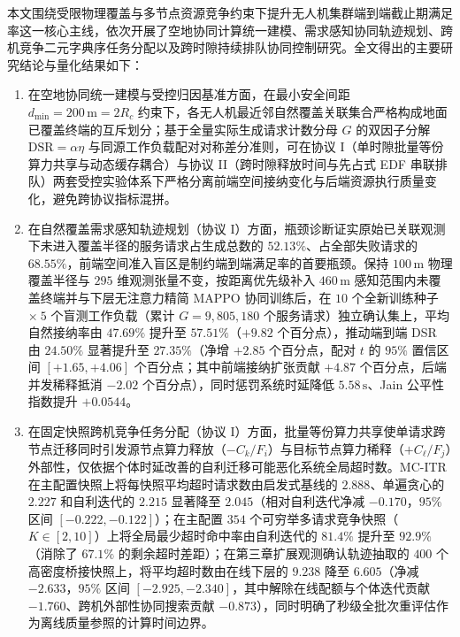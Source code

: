 \conclusionchapter
\label{cha:conclusion}

本文围绕受限物理覆盖与多节点资源竞争约束下提升无人机集群端到端截止期满足率这一核心主线，依次开展了空地协同计算统一建模、需求感知协同轨迹规划、跨机竞争二元字典序任务分配以及跨时隙持续排队协同控制研究。全文得出的主要研究结论与量化结果如下：

\begin{enumerate}
\item 在空地协同统一建模与受控归因基准方面，在最小安全间距 $d_{\min}=200\,\mathrm{m}=2R_c$ 约束下，各无人机最近邻自然覆盖关联集合严格构成地面已覆盖终端的互斥划分；基于全量实际生成请求计数分母 $G$ 的双因子分解 $\mathrm{DSR}=\alpha\eta$ 与同源工作负载配对对称差分准则，可在协议 I（单时隙批量等份算力共享与动态缓存耦合）与协议 II（跨时隙释放时间与先占式 EDF 串联排队）两套受控实验体系下严格分离前端空间接纳变化与后端资源执行质量变化，避免跨协议指标混拼。

\item 在自然覆盖需求感知轨迹规划（协议 I）方面，瓶颈诊断证实原始已关联观测下未进入覆盖半径的服务请求占生成总数的 $52.13\%$、占全部失败请求的 $68.55\%$，前端空间准入盲区是制约端到端满足率的首要瓶颈。保持 $100\,\mathrm{m}$ 物理覆盖半径与 $295$ 维观测张量不变，按距离优先级补入 $460\,\mathrm{m}$ 感知范围内未覆盖终端并与下层无注意力精简 MAPPO 协同训练后，在 $10$ 个全新训练种子 $\times\ 5$ 个盲测工作负载（累计 $G=9{,}805{,}180$ 个服务请求）独立确认集上，平均自然接纳率由 $47.69\%$ 提升至 $57.51\%$（$+9.82$ 个百分点），推动端到端 DSR 由 $24.50\%$ 显著提升至 $27.35\%$（净增 $+2.85$ 个百分点，配对 $t$ 的 $95\%$ 置信区间 $[+1.65,+4.06]$ 个百分点；其中前端接纳扩张贡献 $+4.87$ 个百分点，后端并发稀释抵消 $-2.02$ 个百分点），同时惩罚系统时延降低 $5.58\,\mathrm{s}$、Jain 公平性指数提升 $+0.0544$。

\item 在固定快照跨机竞争任务分配（协议 I）方面，批量等份算力共享使单请求跨节点迁移同时引发源节点算力释放（$-C_k/F_i$）与目标节点算力稀释（$+C_\ell/F_j$）外部性，仅依据个体时延改善的自利迁移可能恶化系统全局超时数。MC-ITR 在主配置快照上将每快照平均超时请求数由启发式基线的 $2.888$、单遍贪心的 $2.227$ 和自利迭代的 $2.215$ 显著降至 $2.045$（相对自利迭代净减 $-0.170$，$95\%$ 区间 $[-0.222,-0.122]$）；在主配置 $354$ 个可穷举多请求竞争快照（$K\in[2,10]$）上将全局最少超时命中率由自利迭代的 $81.4\%$ 提升至 $92.9\%$（消除了 $67.1\%$ 的剩余超时差距）；在第三章扩展观测确认轨迹抽取的 $400$ 个高密度桥接快照上，将平均超时数由在线下层的 $9.238$ 降至 $6.605$（净减 $-2.633$，$95\%$ 区间 $[-2.925,-2.340]$，其中解除在线配额与个体迭代贡献 $-1.760$、跨机外部性协同搜索贡献 $-0.873$），同时明确了秒级全批次重评估作为离线质量参照的计算时间边界。


\end{enumerate}
